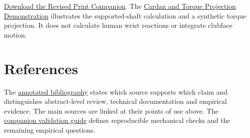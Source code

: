 \documentclass[
  11pt,
]{article}
\begin{document}
\href{https://affinedrift.com/content/wrist-as-universal-joint/Wrist_Universal_Claude.pdf}{Download
the Revised Print Companion}. The
\href{https://affinedrift.com/src/tools/wrist_universal_joint/grip_angle_simulator.html}{Cardan
and Torque Projection Demonstration} illustrates the supported-shaft
calculation and a synthetic torque projection. It does not calculate
human wrist reactions or integrate clubface motion.

\section*{References}\label{references}

The
\href{https://github.com/D-sorganization/AffineDrift/blob/main/articles/wrist-universal-joint-bibliography.md}{annotated
bibliography} states which source supports which claim and distinguishes
abstract-level review, technical documentation and empirical evidence.
The main sources are linked at their points of use above. The
\href{https://github.com/D-sorganization/AffineDrift/blob/main/content/wrist-as-universal-joint/VALIDATION_AND_TESTING.md}{companion
validation guide} defines reproducible mechanical checks and the
remaining empirical questions.
\end{document}
